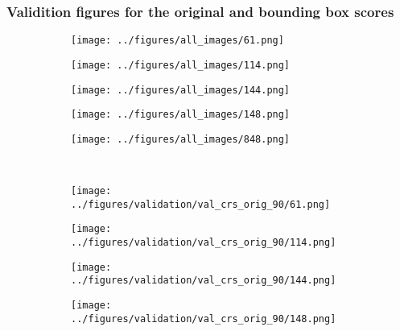 \newpage
\subsubsection{Validition figures for the original and bounding box scores}\label{SS:furtherval}
\begin{figure}[h!]
	\begin{subfigure}{0.19\textwidth}
		\centering
		\texttt{[image: ../figures/all\_images/61.png]}
		\label{fig:1}
	\end{subfigure}
	\begin{subfigure}{0.19\textwidth}
		\centering
		\texttt{[image: ../figures/all\_images/114.png]}
		\label{fig:1}
	\end{subfigure}
	\begin{subfigure}{0.19\textwidth}
		\centering
		\texttt{[image: ../figures/all\_images/144.png]}
		\label{fig:1}
	\end{subfigure}
	\begin{subfigure}{0.19\textwidth}
		\centering
		\texttt{[image: ../figures/all\_images/148.png]}
		\label{fig:1}
	\end{subfigure}
	\begin{subfigure}{0.19\textwidth}
		\centering
		\texttt{[image: ../figures/all\_images/848.png]}
		\label{fig:1}
	\end{subfigure}
	\vspace{-0.35cm}
	\\
	\begin{subfigure}{0.19\textwidth}
		\centering
		\texttt{[image: ../figures/validation/val\_crs\_orig\_90/61.png]}
		\label{fig:1}
	\end{subfigure}
	\begin{subfigure}{0.19\textwidth}
		\centering
		\texttt{[image: ../figures/validation/val\_crs\_orig\_90/114.png]}
		\label{fig:1}
	\end{subfigure}
	\begin{subfigure}{0.19\textwidth}
		\centering
		\texttt{[image: ../figures/validation/val\_crs\_orig\_90/144.png]}
		\label{fig:1}
	\end{subfigure}
	\begin{subfigure}{0.19\textwidth}
		\centering
		\texttt{[image: ../figures/validation/val\_crs\_orig\_90/148.png]}
		\label{fig:1}
	\end{subfigure}
	\begin{subfigure}{0.19\textwidth}

\end{subfigure}
\end{figure}
